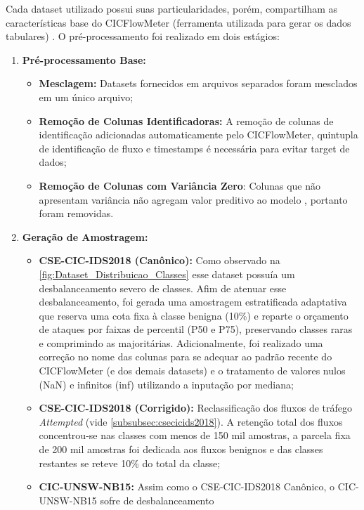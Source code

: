 Cada dataset utilizado possui suas particularidades, porém, compartilham as características base do CICFlowMeter 
(ferramenta utilizada para gerar os dados tabulares) \cite{Sharafaldin2018TowardGA}. O pré-processamento foi realizado
em dois estágios:
\begin{enumerate}
    \item \textbf{Pré-processamento Base:} \begin{itemize}
        \item \textbf{Mesclagem:} Datasets fornecidos em arquivos separados foram mesclados em um único arquivo;
        \item \textbf{Remoção de Colunas Identificadoras:} A remoção de colunas de identificação adicionadas 
        automaticamente pelo CICFlowMeter, quintupla de identificação de fluxo e timestamps é necessária para evitar
        target de dados;
        \item \textbf{Remoção de Colunas com Variância Zero}: Colunas que não apresentam variância não agregam valor
        preditivo ao modelo \cite{wang2023deep}, portanto foram removidas.
    \end{itemize}
    \item \textbf{Geração de Amostragem:} \begin{itemize}
        \item \textbf{CSE-CIC-IDS2018 (Canônico):} Como observado na \ref{fig:Dataset_Distribuicao_Classes} esse dataset 
        possuía um desbalanceamento severo de classes. Afim de atenuar esse desbalanceamento, foi gerada uma 
        amostragem estratificada adaptativa que reserva uma cota fixa à classe benigna (10\%) e reparte o orçamento de 
        ataques por faixas de percentil (P50 e P75), preservando classes raras e comprimindo as majoritárias.
        Adicionalmente, foi realizado uma correção no nome das colunas para se adequar ao padrão recente do 
        CICFlowMeter (e dos demais datasets) e o tratamento de valores nulos (NaN) e infinitos (inf) utilizando a
        inputação por mediana;
        \item \textbf{CSE-CIC-IDS2018 (Corrigido):} Reclassificação dos fluxos de tráfego \emph{Attempted} (vide 
        \ref{subsubsec:csecicids2018}). A retenção total dos fluxos concentrou-se nas classes com menos de 150 mil 
        amostras, a parcela fixa de 200 mil amostras foi dedicada aos fluxos benignos e das classes restantes se reteve
        10\% do total da classe;
        \item \textbf{CIC-UNSW-NB15:} Assim como o CSE-CIC-IDS2018 Canônico, o CIC-UNSW-NB15 sofre de desbalanceamento

\end{itemize}
\end{enumerate}
